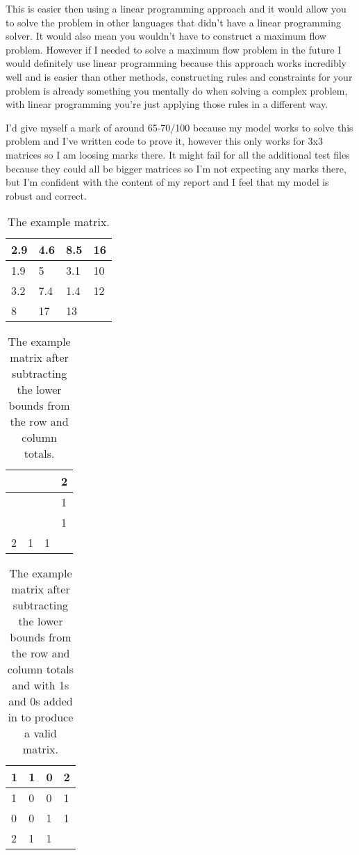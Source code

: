 \documentclass[10pt]{article}
\begin{document}
This is easier then using a linear programming approach and it would allow you to solve the problem in other languages that didn't have a linear programming solver. It would also mean you wouldn't have to construct a maximum flow problem. However if I needed to solve a maximum flow problem in the future I would definitely use linear programming because this approach works incredibly well and is easier than other methods, constructing rules and constraints for your problem is already something you mentally do when solving a complex problem, with linear programming you're just applying those rules in a different way.

I'd give myself a mark of around 65-70/100 because my model works to solve this problem and I've written code to prove it, however this only works for 3x3 matrices so I am loosing marks there. It might fail for all the additional test files because they could all be bigger matrices so I'm not expecting any marks there, but I'm confident with the content of my report and I feel that my model is robust and correct.

\begin{table}[]
\centering
\begin{tabular}{|l|l|l|l|}
\hline
2.9 & 4.6 & 8.5 & 16 \\ \hline
1.9 & 5   & 3.1 & 10 \\ \hline
3.2 & 7.4 & 1.4 & 12 \\ \hline
8   & 17  & 13  &    \\ \hline
\end{tabular}
\caption{The example matrix.}
\label{tab:matrix}
\end{table}

\begin{table}[]
\centering
\begin{tabular}{|l|l|l|l|}
\hline
  &   &   & 2 \\ \hline
  &   &   & 1 \\ \hline
  &   &   & 1 \\ \hline
2 & 1 & 1 &   \\ \hline
\end{tabular}
\caption{The example matrix after subtracting the lower bounds from the row and column totals.}
\label{tab:matrixaftersubtraction}
\end{table}

\begin{table}[]
\centering
\begin{tabular}{|l|l|l|l|}
\hline
1 & 1 & 0 & 2 \\ \hline
1 & 0 & 0 & 1 \\ \hline
0 & 0 & 1 & 1 \\ \hline
2 & 1 & 1 &   \\ \hline
\end{tabular}
\caption{The example matrix after subtracting the lower bounds from the row and column totals and with 1s and 0s added in to produce a valid matrix.}
\label{tab:matrixaftersubtractionwithplacements}
\end{table}
\end{document}
